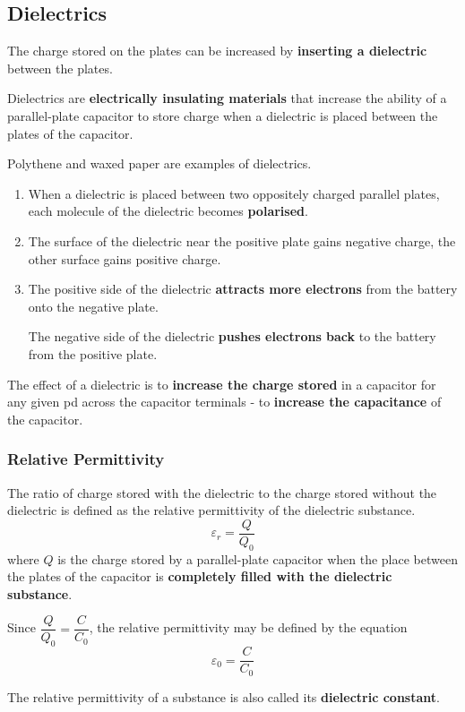\subsection{Dielectrics}

The charge stored on the plates can be increased by \textbf{inserting a dielectric} between the plates.

Dielectrics are \textbf{electrically insulating materials} that increase the ability of a parallel-plate capacitor to store charge when a dielectric is placed between the plates of the capacitor.

Polythene and waxed paper are examples of dielectrics.
\begin{enumerate}
    \item When a dielectric is placed between two oppositely charged parallel plates, each molecule of the dielectric becomes \textbf{polarised}.
    \item The surface of the dielectric near the positive plate gains negative charge, the other surface gains positive charge.
    \item The positive side of the dielectric \textbf{attracts more electrons} from the battery onto the negative plate.

        The negative side of the dielectric \textbf{pushes electrons back} to the battery from the positive plate.
\end{enumerate}

The effect of a dielectric is to \textbf{increase the charge stored} in a capacitor for any given pd across the capacitor terminals - to \textbf{increase the capacitance} of the capacitor.

\subsubsection*{Relative Permittivity}

The ratio of charge stored with the dielectric to the charge stored without the dielectric is defined as the relative permittivity of the dielectric substance.
$$\varepsilon_r=\frac{Q}{Q_0}$$
where $Q$ is the charge stored by a parallel-plate capacitor when the place between the plates of the capacitor is \textbf{completely filled with the dielectric substance}.

Since $\dfrac{Q}{Q_0}=\dfrac{C}{C_0}$, the relative permittivity may be defined by the equation
$$\varepsilon_0=\frac{C}{C_0}$$

The relative permittivity of a substance is also called its \textbf{dielectric constant}.

